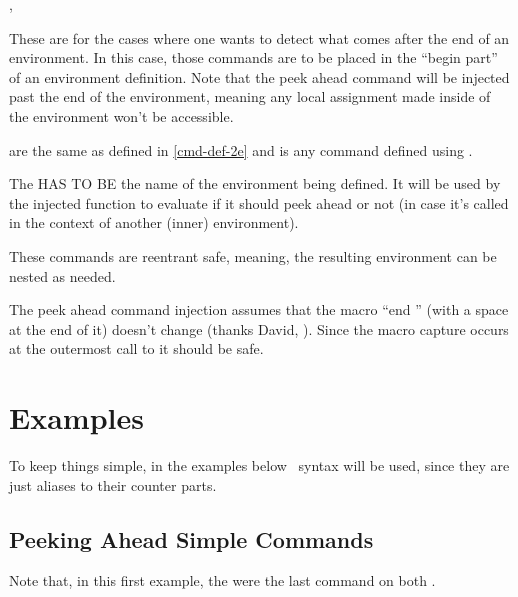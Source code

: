 \documentclass[10pt]{article}
\begin{document}
\begin{codedescribe}{\xpeekEnvCmd, \xpeekEnv}
\begin{codesyntax}%
\end{codesyntax}
These are for the cases where one wants to detect what comes after the end of an environment. In this case, those commands are to be placed in the ``begin part'' of an environment definition. Note that the peek ahead command will be injected past the end of the environment, meaning any local assignment made inside of the environment won't be accessible. 

 are the same as defined in \ref{cmd-def-2e} and  is any command defined using \tsobj[code,sep=or]{\xpeekSetCmd, \xpeekSetCmdGlobal}.
\end{codedescribe}
\begin{tsremark}
  The  HAS TO BE the name of the environment being defined. It will be used by the injected function to evaluate if it should peek ahead or not (in case it's called in the context of another (inner) environment).
\end{tsremark}
\begin{tsremark}
  These commands are reentrant safe, meaning, the resulting environment can be nested as needed.
\end{tsremark}
\begin{tsremark}
  The peek ahead command injection assumes that the macro ``end '' (with a space at the end of it) doesn't change (thanks David, \cite{stackexchange}). Since the macro capture  occurs at the outermost call to \tsobj[code,sep=or]{\xpeekEnv,\xpeekEnvCmd} it should be safe.

\end{tsremark}

\newpage 

\section{Examples}

To keep things simple, in the examples below \LaTeXe\ syntax will be used, since they are just aliases to their  counter parts. 

\subsection{Peeking Ahead Simple Commands}
Note that, in this first example, the \tsobj{\xpeekTok,\xpeekTokCmd} were the last command on  both \tsobj{\cmdA,\cmdB}.
\end{document}
